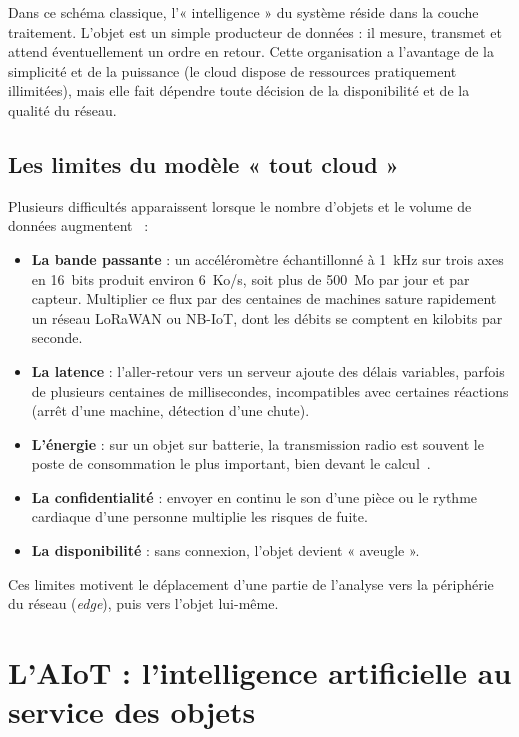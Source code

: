 Dans ce schéma classique, l'« intelligence » du système réside dans la couche
traitement. L'objet est un simple producteur de données : il mesure, transmet et
attend éventuellement un ordre en retour. Cette organisation a l'avantage de la
simplicité et de la puissance (le cloud dispose de ressources pratiquement
illimitées), mais elle fait dépendre toute décision de la disponibilité et de la
qualité du réseau.

\subsection{Les limites du modèle « tout cloud »}

Plusieurs difficultés apparaissent lorsque le nombre d'objets et le volume de
données augmentent~\cite{shi2016edge} :
\begin{itemize}
  \item \textbf{La bande passante} : un accéléromètre échantillonné à 1~kHz sur
        trois axes en 16~bits produit environ 6~Ko/s, soit plus de 500~Mo par
        jour et par capteur. Multiplier ce flux par des centaines de machines
        sature rapidement un réseau LoRaWAN ou NB-IoT, dont les débits se
        comptent en kilobits par seconde.
  \item \textbf{La latence} : l'aller-retour vers un serveur ajoute des délais
        variables, parfois de plusieurs centaines de millisecondes, incompatibles
        avec certaines réactions (arrêt d'une machine, détection d'une chute).
  \item \textbf{L'énergie} : sur un objet sur batterie, la transmission radio
        est souvent le poste de consommation le plus important, bien devant le
        calcul~\cite{warden2019tinyml}.
  \item \textbf{La confidentialité} : envoyer en continu le son d'une pièce ou
        le rythme cardiaque d'une personne multiplie les risques de fuite.
  \item \textbf{La disponibilité} : sans connexion, l'objet devient « aveugle ».
\end{itemize}
Ces limites motivent le déplacement d'une partie de l'analyse vers la
périphérie du réseau (\emph{edge}), puis vers l'objet lui-même.

\section{L'AIoT : l'intelligence artificielle au service des objets}
\label{sec:aiot}

